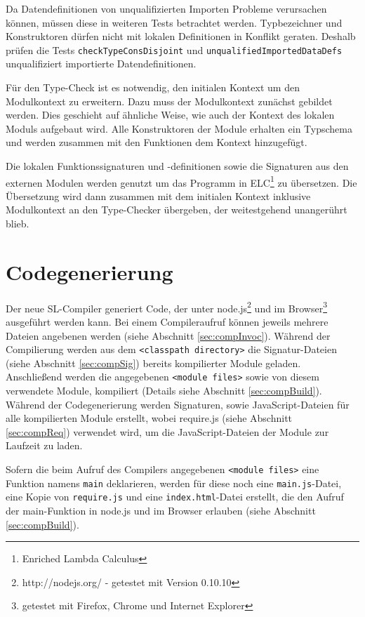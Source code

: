 \documentclass[runningheads]{llncs}
\begin{document}
Da Datendefinitionen von unqualifizierten Importen Probleme verursachen können, müssen diese in weiteren Tests betrachtet werden. Typbezeichner und Konstruktoren dürfen nicht mit lokalen Definitionen in Konflikt geraten. Deshalb prüfen die Tests \verb|checkTypeConsDisjoint| und \verb|unqualifiedImportedDataDefs| unqualifiziert importierte Datendefinitionen.

Für den Type-Check ist es notwendig, den initialen Kontext um den Modulkontext zu erweitern. Dazu muss der Modulkontext zunächst gebildet werden. Dies geschieht auf ähnliche Weise, wie auch der Kontext des lokalen Moduls aufgebaut wird. Alle Konstruktoren der Module erhalten ein Typschema und werden zusammen mit den Funktionen dem Kontext hinzugefügt.

Die lokalen Funktionssignaturen und -definitionen sowie die Signaturen aus den externen Modulen werden genutzt um das Programm in ELC\footnote{Enriched Lambda Calculus} zu übersetzen. Die Übersetzung wird dann zusammen mit dem initialen Kontext inklusive Modulkontext an den Type-Checker übergeben, der weitestgehend unangerührt blieb.

\section{Codegenerierung}
\label{sec:codegen}

Der neue SL-Compiler generiert Code, der unter node.js\footnote{http://nodejs.org/ - getestet mit Version 0.10.10} und im Browser\footnote{getestet mit Firefox, Chrome und Internet Explorer} ausgeführt werden kann. Bei einem Compileraufruf können jeweils mehrere
Dateien angebenen werden (siehe Abschnitt \ref{sec:compInvoc}). Während
der Compilierung werden aus dem \texttt{<classpath directory>} die
Signatur-Dateien (siehe Abschnitt \ref{sec:compSig}) bereits
kompilierter Module geladen. Anschließend werden die angegebenen
\texttt{<module files>} sowie von diesem verwendete Module, kompiliert
(Details siehe Abschnitt \ref{sec:compBuild}). Während der Codegenerierung
werden Signaturen, sowie JavaScript-Dateien für alle
kompilierten Module erstellt, wobei require.js (siehe Abschnitt
\ref{sec:compReq}) verwendet wird, um die JavaScript-Dateien der
Module zur Laufzeit zu laden.

Sofern die beim Aufruf des Compilers angegebenen
\texttt{<module files>} eine Funktion namens
\texttt{main} deklarieren, werden für diese noch eine
\texttt{main.js}-Datei, eine Kopie von \texttt{require.js} und eine
\texttt{index.html}-Datei erstellt,
die den Aufruf der main-Funktion in node.js und im Browser erlauben
(siehe Abschnitt \ref{sec:compBuild}).
\end{document}
